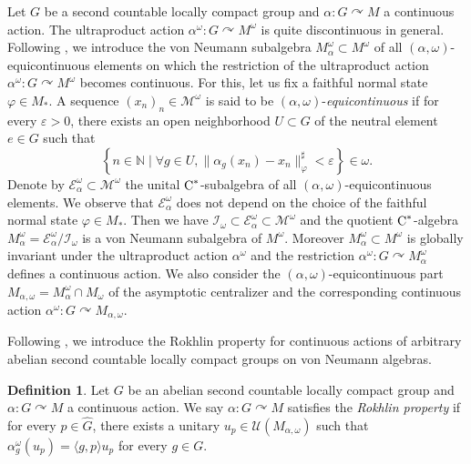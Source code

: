 \documentclass[a4paper,11pt]{amsart}
\numberwithin{equation}{section}
\theoremstyle{definition}
\newtheorem{definition}[theorem]{Definition}
\newcommand{\N}{\mathbb{N}}
\newcommand{\rC}{\mathord{\text{\rm C}}}
\begin{document}
Let $G$ be a second countable locally compact group and $\alpha : G \curvearrowright M$ a continuous action. The ultraproduct action $\alpha^\omega : G \curvearrowright M^\omega$ is quite discontinuous in general. Following \cite[Section 3]{MT12}, we introduce the von Neumann subalgebra $M^\omega_\alpha \subset M^\omega$ of all $(\alpha, \omega)$-equicontinuous elements on which the restriction of the ultraproduct action $\alpha^\omega : G \curvearrowright M^\omega$ becomes continuous. For this, let us fix a faithful normal state $\varphi \in M_\ast$. A sequence $(x_n)_n \in \mathcal M^\omega$ is said to be $(\alpha, \omega)$-{\em equicontinuous} if for every $\varepsilon > 0$, there exists an open neighborhood $U \subset G$ of the neutral element $e \in G$ such that 
$$\left\{n \in \N \mid \forall g \in U, \|\alpha_g(x_n) - x_n\|_\varphi^\sharp < \varepsilon \right\} \in \omega.$$
Denote by $\mathcal E_\alpha^\omega \subset \mathcal M^\omega$ the unital $\rC^*$-subalgebra of all $(\alpha, \omega)$-equicontinuous elements. We observe that $\mathcal E_\alpha^\omega$ does not depend on the choice of the faithful normal state $\varphi \in M_\ast$. Then we have $\mathcal I_\omega \subset \mathcal E_\alpha^\omega \subset \mathcal M^\omega$ and the quotient $\rC^*$-algebra $M_\alpha^\omega = \mathcal E_\alpha^\omega/ \mathcal{I}_\omega$ is a von Neumann subalgebra of $M^\omega$. Moreover $M_\alpha^\omega \subset M^\omega$ is globally invariant under the ultraproduct action $\alpha^\omega$ and the restriction $\alpha^\omega : G \curvearrowright M_\alpha^\omega$ defines a continuous action. We also consider the $(\alpha, \omega)$-equicontinuous part $M_{\alpha, \omega} = M_\alpha^\omega \cap M_\omega$ of the asymptotic centralizer and the corresponding continuous action $\alpha^\omega : G \curvearrowright M_{\alpha, \omega}$.

Following \cite[Section 4]{MT12}, we introduce the Rokhlin property for continuous actions of arbitrary abelian second countable locally compact groups on von Neumann algebras.

\begin{definition}\label{Rokhlin property}
Let $G$ be an abelian second countable locally compact group and $\alpha : G \curvearrowright M$ a continuous action. We say $\alpha : G \curvearrowright M$ satisfies the {\em Rokhlin property} if for every $p \in \widehat G$, there exists a unitary $u_p \in \mathcal U(M_{\alpha, \omega})$ such that $\alpha^\omega_g(u_p) = \langle g, p\rangle u_p$ for every $g \in G$.
\end{definition}
\end{document}

